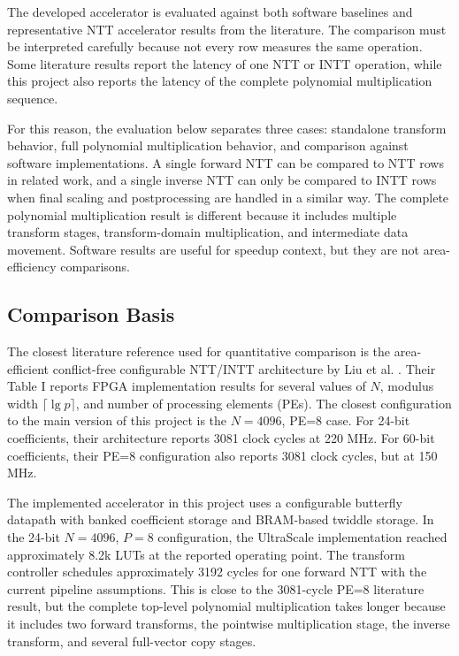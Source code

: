 \documentclass[a4paper, 12pt, titlepage]{article}
\begin{document}
The developed accelerator is evaluated against both software baselines and
representative NTT accelerator results from the literature. The comparison must
be interpreted carefully because not every row measures the same operation.
Some literature results report the latency of one NTT or INTT operation, while
this project also reports the latency of the complete polynomial multiplication
sequence.

For this reason, the evaluation below separates three cases: standalone
transform behavior, full polynomial multiplication behavior, and comparison
against software implementations. A single forward NTT can be compared to NTT
rows in related work, and a single inverse NTT can only be compared to INTT rows
when final scaling and postprocessing are handled in a similar way. The complete
polynomial multiplication result is different because it includes multiple
transform stages, transform-domain multiplication, and intermediate data
movement.
Software results are useful for speedup context, but they are not area-efficiency
comparisons.

\subsection{Comparison Basis}

The closest literature reference used for quantitative comparison is the
area-efficient conflict-free configurable NTT/INTT architecture by Liu et al.
\cite{area-efficient}. Their Table I reports FPGA implementation results for
several values of $N$, modulus width $\lceil \lg p \rceil$, and number of
processing elements (PEs). The closest configuration to the main version of this
project is the $N=4096$, PE=8 case. For 24-bit coefficients, their architecture
reports 3081 clock cycles at 220 MHz. For 60-bit coefficients, their PE=8
configuration also reports 3081 clock cycles, but at 150 MHz.

The implemented accelerator in this project uses a configurable butterfly
datapath with banked coefficient storage and BRAM-based twiddle storage. In the
24-bit \(N=4096\), \(P=8\) configuration, the UltraScale implementation reached
approximately 8.2k LUTs at the reported operating point. The transform
controller schedules approximately 3192 cycles for one forward NTT with the
current pipeline assumptions. This is close to the 3081-cycle PE=8 literature
result, but the complete top-level polynomial multiplication takes longer
because it includes two forward transforms, the pointwise multiplication stage,
the inverse transform, and several full-vector copy stages.
\end{document}
